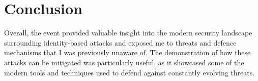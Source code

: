 \hypertarget{conclusion}{%
\section{Conclusion}\label{conclusion}}

Overall, the event provided valuable insight into the modern security
landscape surrounding identity-based attacks and exposed me to threats
and defence mechanisms that I was previously unaware of. The
demonstration of how these attacks can be mitigated was particularly
useful, as it showcased some of the modern tools and techniques used to
defend against constantly evolving threats.

